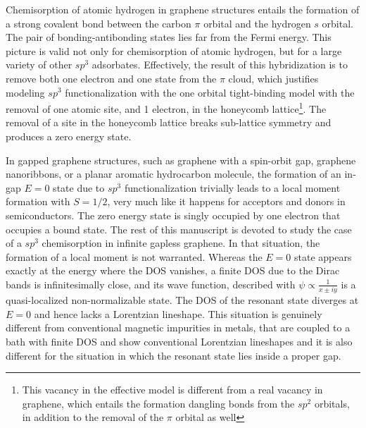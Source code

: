 Chemisorption of atomic hydrogen in graphene structures entails the formation
of a strong covalent bond between the carbon $\pi$ orbital and the hydrogen $s$
orbital. The pair of bonding-antibonding states lies far from the Fermi energy.
This picture is valid not only for chemisorption of atomic hydrogen, but for a
large variety of other  $sp^3$ adsorbates. \cite{santos2012}
Effectively, the result of this  hybridization is to remove both one electron
and one state from the $\pi$ cloud, which justifies modeling $sp^3$
functionalization with the one orbital tight-binding model with the removal of
one atomic site, and 1 electron, in the honeycomb lattice\footnote{This vacancy
in the effective model is different from a real vacancy in graphene, which
entails the formation dangling bonds from the $sp^2$ orbitals, in addition to
the removal of the $\pi$ orbital as well}.
The removal of a site in the honeycomb lattice breaks sub-lattice symmetry and produces a zero energy state.\cite{Pereira2006,kumazaki2007,Wehling2007,Pereira2008,Palacios2008}

In gapped graphene structures, such as graphene with a spin-orbit gap,
\cite{Gonzalez2012} graphene nanoribbons,\cite{Palacios2008} or a planar
aromatic hydrocarbon molecule, the formation of an in-gap $E=0$ state due to
$sp^3$ functionalization trivially leads to a local moment formation with
$S=1/2$, very much like it happens for acceptors and donors in semiconductors.
The zero energy state is singly occupied by one electron
that occupies a bound state.
The rest of this manuscript is devoted to study the case of a $sp^3$ chemisorption in infinite gapless graphene. In that situation, the formation of a local moment is not warranted. Whereas the $E=0$  state appears exactly at the energy where the DOS vanishes, a finite DOS due to the Dirac bands is infinitesimally close, and its wave function, described with $\psi\propto\frac{1}{x\pm i y}$ is a quasi-localized non-normalizable state.\cite{Pereira2006}
The DOS of the resonant state diverges at $E=0$ and hence lacks a Lorentzian lineshape.   %
This situation is genuinely different from conventional magnetic impurities in metals, that are coupled to a bath with finite DOS and show conventional Lorentzian lineshapes and it is also different for the situation in which the resonant state lies inside a proper gap.

